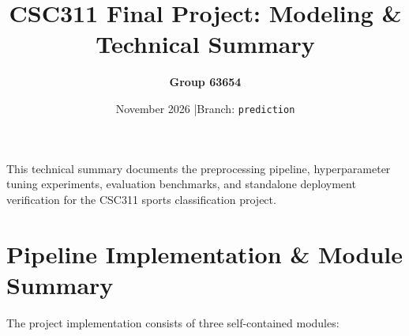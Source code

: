 \documentclass[11pt,a4paper]{article}
\title{\vspace{-1.5em}\Large\textbf{CSC311 Final Project: Modeling \& Technical Summary}\vspace{-0.5em}}
\author{\textbf{Group 63654}}
\date{\small November 2026 \quad|\quad Branch: \texttt{prediction}}
\begin{document}
\maketitle
\vspace{-1.5em}

This technical summary documents the preprocessing pipeline, hyperparameter tuning experiments, evaluation benchmarks, and standalone deployment verification for the CSC311 sports classification project.

\section{Pipeline Implementation \& Module Summary}
The project implementation consists of three self-contained modules:
\end{document}
